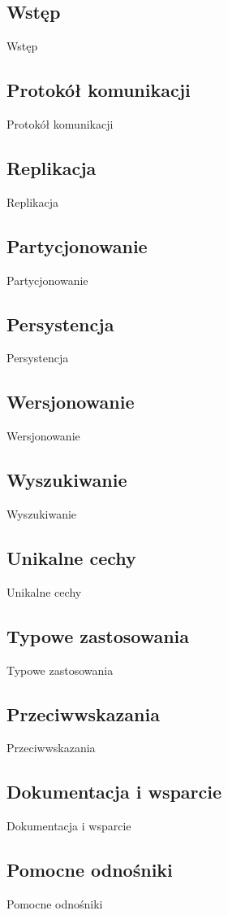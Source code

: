 \subsection*{Wstęp} 

Wstęp

\subsection*{Protokół komunikacji}

Protokół komunikacji

\subsection*{Replikacja}

Replikacja

\subsection*{Partycjonowanie}

Partycjonowanie

\subsection*{Persystencja}

Persystencja

\subsection*{Wersjonowanie}

Wersjonowanie

\subsection*{Wyszukiwanie}

Wyszukiwanie

\subsection*{Unikalne cechy}

Unikalne cechy

\subsection*{Typowe zastosowania}

Typowe zastosowania

\subsection*{Przeciwwskazania}

Przeciwwskazania

\subsection*{Dokumentacja i wsparcie}

Dokumentacja i wsparcie

\subsection*{Pomocne odnośniki}
 
Pomocne odnośniki